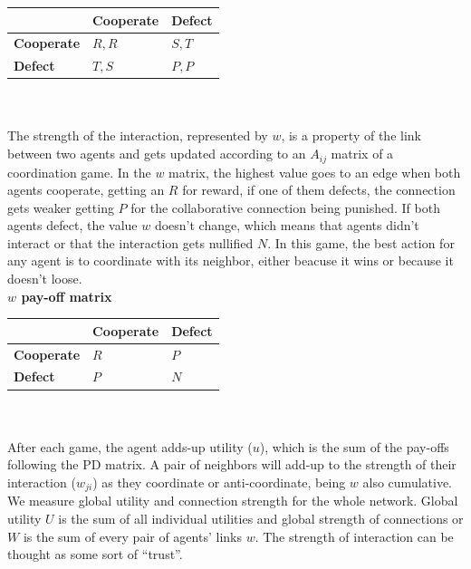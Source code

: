 \documentclass[11pt]{article}
\begin{document}
\begin{tabular}{| l | l | l |}
\hline
          & \bf{Cooperate} & \bf{Defect} \\ \hline
\bf{Cooperate} &  $R,R$      &  $S,T$   \\ \hline
\bf{Defect}    &  $T,S$      &  $P,P$   \\ \hline

\end{tabular}\\ \\

The strength of the interaction, represented by $w$, is a property of the link between two agents and
gets updated according to an $A_{ij}$ matrix of a coordination game. In the $w$ matrix, the highest value
goes to an edge when both agents cooperate, getting an $R$ for reward, if one of
them defects, the connection gets weaker getting $P$ for the collaborative
connection being punished. If both agents defect, the value $w$ doesn't change,
which means that agents didn't interact or that the interaction gets nullified
$N$. In this game, the best action for any agent is to coordinate with its
neighbor, either beacuse it wins or because it doesn't loose. \\ 

{\bf $w$ pay-off matrix}\\

\begin{tabular}{| l | l | l |}
\hline
          & \bf{Cooperate} & \bf{Defect} \\ \hline
\bf{Cooperate} &  $R$      &  $P$   \\ \hline
\bf{Defect}    &  $P$      &  $N$   \\ \hline

\end{tabular}\\ \\


After each game, the agent adds-up utility ($u$), which is the sum of the
pay-offs following the PD matrix. A pair of neighbors will add-up to the strength of
their interaction ($w_{ji}$) as they coordinate or anti-coordinate, being $w$
also cumulative. We measure global utility and connection strength for the whole
network. Global utility $U$ is the sum of all individual utilities and global
strength of connections or $W$ is the sum of every pair of agents' links
$w$. The strength of interaction can 
be thought as some sort of ``trust''.\\
\end{document}
